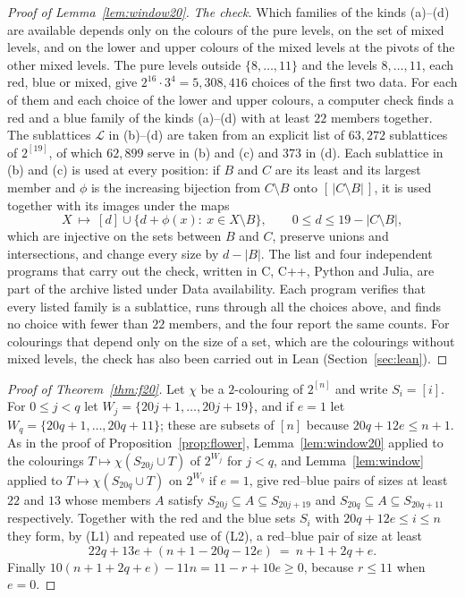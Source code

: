 \documentclass[11pt,reqno]{amsart}
\numberwithin{equation}{section}
\theoremstyle{plain}
\theoremstyle{definition}
\theoremstyle{remark}
\newcommand{\cL}{\mathcal{L}}
\begin{document}
\begin{proof}[Proof of Lemma~\ref{lem:window20}]
\emph{The check.} Which families of the kinds (a)--(d) are available
depends only on the colours of the pure levels, on the set of mixed
levels, and on the lower and upper colours of the mixed levels at the
pivots of the other mixed levels. The pure levels outside
$\{8,\dots,11\}$ and the levels $8,\dots,11$, each red, blue or mixed,
give $2^{16}\cdot3^{4}=5{,}308{,}416$ choices of the first two data. For
each of them and each choice of the lower and upper colours, a computer
check finds a red and a blue family of the kinds (a)--(d) with at least
$22$ members together. The sublattices $\cL$ in (b)--(d) are taken from
an explicit list of $63{,}272$ sublattices of $2^{[19]}$, of which
$62{,}899$ serve in (b) and (c) and $373$ in (d). Each sublattice in (b)
and (c) is used at every position: if $B$ and $C$ are its least and its
largest member and $\phi$ is the increasing bijection from $C\setminus B$
onto $[\,|C\setminus B|\,]$, it is used together with its images under
the maps
\[
X\ \longmapsto\ [d]\cup\{d+\phi(x):\ x\in X\setminus B\},\qquad
0\le d\le19-|C\setminus B|,
\]
which are injective on the sets between $B$ and $C$, preserve unions and
intersections, and change every size by $d-|B|$. The list and four
independent programs that carry out the check, written in C, C++, Python
and Julia, are part of the archive listed under Data availability. Each
program verifies that
every listed family is a sublattice, runs through all the choices above,
and finds no choice with fewer than $22$ members, and the four report the
same counts. For colourings that depend only on the size of a set, which
are the colourings without mixed levels, the check has also been carried
out in Lean (Section~\ref{sec:lean}).
\end{proof}

\begin{proof}[Proof of Theorem~\ref{thm:f20}]
Let $\chi$ be a $2$-colouring of $2^{[n]}$ and write $S_i=[i]$. For
$0\le j<q$ let $W_j=\{20j+1,\dots,20j+19\}$, and if $e=1$ let
$W_q=\{20q+1,\dots,20q+11\}$; these are subsets of $[n]$ because
$20q+12e\le n+1$. As in the proof of Proposition~\ref{prop:flower},
Lemma~\ref{lem:window20} applied to the colourings
$T\mapsto\chi(S_{20j}\cup T)$ of $2^{W_j}$ for $j<q$, and
Lemma~\ref{lem:window} applied to $T\mapsto\chi(S_{20q}\cup T)$ on
$2^{W_q}$ if $e=1$, give red--blue pairs of sizes at least $22$ and $13$
whose members $A$ satisfy $S_{20j}\subseteq A\subseteq S_{20j+19}$ and
$S_{20q}\subseteq A\subseteq S_{20q+11}$ respectively. Together with the
red and the blue sets $S_i$ with $20q+12e\le i\le n$ they form, by (L1)
and repeated use of (L2), a red--blue pair of size at least
\[
22q+13e+(n+1-20q-12e)\ =\ n+1+2q+e .
\]
Finally $10(n+1+2q+e)-11n=11-r+10e\ge0$, because $r\le11$ when $e=0$.
\end{proof}
\end{document}
